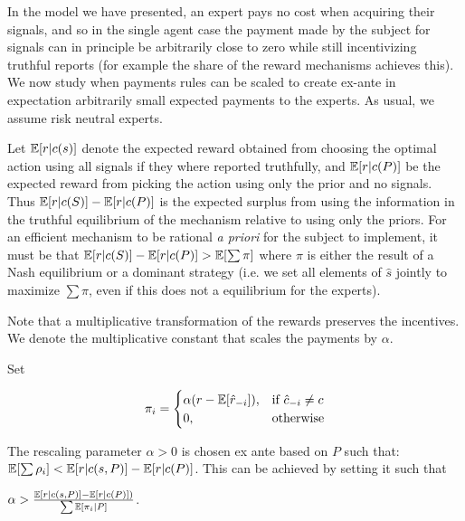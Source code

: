 
In the model we have presented, an expert pays no cost when acquiring their signals, and so in the single agent case the payment made by the subject for signals can in principle be arbitrarily close to zero while still incentivizing truthful reports (for example the share of the reward mechanisms achieves this). We now study when payments rules can be scaled to create ex-ante in expectation arbitrarily small expected payments to the experts. As usual, we assume risk neutral experts. 


Let $\operatorname*{\mathbb E}[r|c(s)]$ denote the expected reward obtained from choosing the optimal action using all signals if they where reported truthfully, and $\operatorname*{\mathbb E}[r|c(P)] $ be the expected reward from picking the action using only the prior and no signals. Thus $\operatorname*{\mathbb E}[r|c(S)] - \operatorname*{\mathbb E}[r|c(P)] $ is the expected surplus from using the information in the truthful equilibrium of the mechanism relative to using only the priors. For an efficient mechanism to be rational \emph{a priori} for the subject to implement, it must be that $\operatorname*{\mathbb E}[r|c(S)] - \operatorname*{\mathbb E}[r|c(P)] > \operatorname*{\mathbb E}[\sum \pi]$ where $\pi$ is either the result of a Nash equilibrium or a dominant strategy (i.e. we set all elements of $\hat{s}$ jointly to maximize $\sum \pi$, even if this does not a equilibrium for the experts).

Note that a multiplicative transformation of the rewards preserves the incentives. We denote the multiplicative constant that scales the payments by $\alpha$.

\begin{mech}
Set

\[
    \pi_i = 
\begin{cases}
    \alpha (r - \expec[\hat{r}_{-i}] ),& \text{if } \hat{c}_{-i} \neq c\\
    0,              & \text{otherwise}
\end{cases}
\]

The rescaling parameter $\alpha>0$ is chosen ex ante based on $P$ such that: $ \operatorname*{\mathbb E}[\sum \rho_i] < \operatorname*{\mathbb E}[r|c(s,P)] - \operatorname*{\mathbb E}[r|c(P)] $. This can be achieved by setting it such that

 $\alpha >   \frac{\operatorname*{\mathbb E}[r|c(s,P)] - \operatorname*{\mathbb E}[r|c(P)] )}{\sum \operatorname*{\mathbb E}[\pi_i|P] }  $. 

\end{mech}


